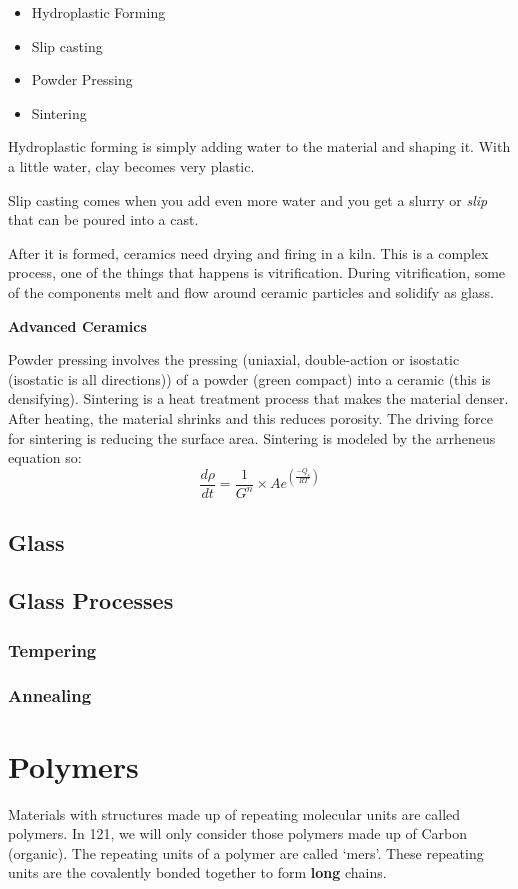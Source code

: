 \documentclass[12pt]{article}
\begin{document}
\begin{itemize}
  \item Hydroplastic Forming
  \item Slip casting 
  \item Powder Pressing
  \item Sintering
\end{itemize}

Hydroplastic forming is simply adding water to the material and shaping it. 
With a little water, clay becomes very plastic.

Slip casting comes when you add even more water and you get a slurry or \textit{slip} that can be poured into a cast.

After it is formed, ceramics need drying and firing in a kiln.
This is a complex process, one of the things that happens is vitrification.
During vitrification, some of the components melt and flow around ceramic particles and solidify as glass. 

\textbf{Advanced Ceramics}

Powder pressing involves the pressing (uniaxial, double-action or isostatic (isostatic is all directions)) of a powder (green compact) into a ceramic (this is densifying).
Sintering is a heat treatment process that makes the material denser.
After heating, the material shrinks and this reduces porosity.
The driving force for sintering is reducing the surface area.
Sintering is modeled by the arrheneus equation so:
\begin{equation*}
  \frac{d\rho}{dt} = \frac{1}{G^n} \times Ae^{(\frac{-Q_s}{RT})}
\end{equation*}

\subsection{Glass}

\subsection{Glass Processes} 
\subsubsection{Tempering}

\subsubsection{Annealing}

\section{Polymers}
Materials with structures made up of repeating molecular units are called polymers.
In 121, we will only consider those polymers made up of Carbon (organic).
The repeating units of a polymer are called `mers'. 
These repeating units are the covalently bonded together to form \textbf{long} chains.
\end{document}
